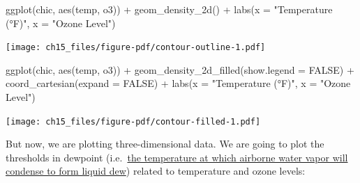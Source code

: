 \documentclass[
  letterpaper,
]{scrbook}
\newenvironment{Shaded}{\begin{snugshade}}{\end{snugshade}}
\newcommand{\AttributeTok}[1]{\textcolor[rgb]{0.40,0.45,0.13}{#1}}
\newcommand{\ConstantTok}[1]{\textcolor[rgb]{0.56,0.35,0.01}{#1}}
\newcommand{\FunctionTok}[1]{\textcolor[rgb]{0.28,0.35,0.67}{#1}}
\newcommand{\NormalTok}[1]{\textcolor[rgb]{0.00,0.23,0.31}{#1}}
\newcommand{\SpecialCharTok}[1]{\textcolor[rgb]{0.37,0.37,0.37}{#1}}
\newcommand{\StringTok}[1]{\textcolor[rgb]{0.13,0.47,0.30}{#1}}
\begin{document}
\begin{Shaded}
\begin{Highlighting}[]
\FunctionTok{ggplot}\NormalTok{(chic, }\FunctionTok{aes}\NormalTok{(temp, o3)) }\SpecialCharTok{+}
  \FunctionTok{geom\_density\_2d}\NormalTok{() }\SpecialCharTok{+}
  \FunctionTok{labs}\NormalTok{(}\AttributeTok{x =} \StringTok{"Temperature (°F)"}\NormalTok{, }\AttributeTok{x =} \StringTok{"Ozone Level"}\NormalTok{)}
\end{Highlighting}
\end{Shaded}

\texttt{[image: ch15\_files/figure-pdf/contour-outline-1.pdf]}

\begin{Shaded}
\begin{Highlighting}[]
\FunctionTok{ggplot}\NormalTok{(chic, }\FunctionTok{aes}\NormalTok{(temp, o3)) }\SpecialCharTok{+}
  \FunctionTok{geom\_density\_2d\_filled}\NormalTok{(}\AttributeTok{show.legend =} \ConstantTok{FALSE}\NormalTok{) }\SpecialCharTok{+}
  \FunctionTok{coord\_cartesian}\NormalTok{(}\AttributeTok{expand =} \ConstantTok{FALSE}\NormalTok{) }\SpecialCharTok{+}
  \FunctionTok{labs}\NormalTok{(}\AttributeTok{x =} \StringTok{"Temperature (°F)"}\NormalTok{, }\AttributeTok{x =} \StringTok{"Ozone Level"}\NormalTok{)}
\end{Highlighting}
\end{Shaded}

\texttt{[image: ch15\_files/figure-pdf/contour-filled-1.pdf]}

But now, we are plotting three-dimensional data. We are going to plot
the thresholds in dewpoint
(i.e.~\href{https://en.wikipedia.org/wiki/Dew_point}{the temperature at
which airborne water vapor will condense to form liquid dew}) related to
temperature and ozone levels:
\end{document}
